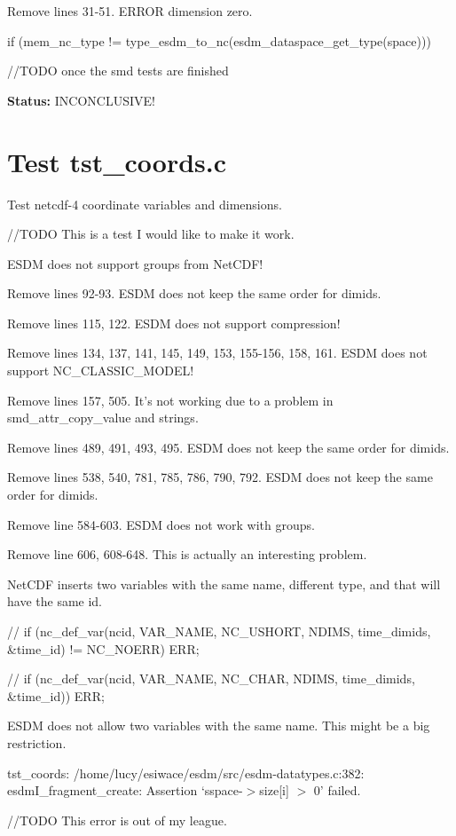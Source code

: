 Remove lines 31-51. ERROR dimension zero.

if (mem\_nc\_type != type\_esdm\_to\_nc(esdm\_dataspace\_get\_type(space)))

//TODO once the smd tests are finished

{\bf \large Status: } INCONCLUSIVE!

\section{Test tst\_coords.c}

Test netcdf-4 coordinate variables and dimensions.

//TODO This is a test I would like to make it work.

ESDM does not support groups from NetCDF!

Remove lines 92-93. ESDM does not keep the same order for dimids.

Remove lines 115, 122. ESDM does not support compression!

Remove lines 134, 137, 141, 145, 149, 153, 155-156, 158, 161. ESDM does not support NC\_CLASSIC\_MODEL!

Remove lines 157, 505. It's not working due to a problem in smd\_attr\_copy\_value and strings.

Remove lines 489, 491, 493, 495. ESDM does not keep the same order for dimids.

Remove lines 538, 540, 781, 785, 786, 790, 792. ESDM does not keep the same order for dimids.

Remove line 584-603. ESDM does not work with groups.

Remove line 606, 608-648. This is actually an interesting problem.

NetCDF inserts two variables with the same name, different type, and that will have the same id.

//       if (nc\_def\_var(ncid, VAR\_NAME, NC\_USHORT, NDIMS, time\_dimids, \&time\_id) != NC\_NOERR) ERR;

//       if (nc\_def\_var(ncid, VAR\_NAME, NC\_CHAR, NDIMS, time\_dimids, \&time\_id)) ERR;

ESDM does not allow two variables with the same name. This might be a big restriction.

tst\_coords: /home/lucy/esiwace/esdm/src/esdm-datatypes.c:382: esdmI\_fragment\_create: Assertion `sspace-$>$size[i] $>$ 0' failed.

//TODO This error is out of my league.


